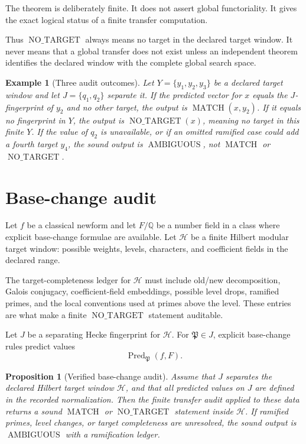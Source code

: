 \documentclass[11pt]{article}
\newtheorem{proposition}[theorem]{Proposition}
\newtheorem{example}[theorem]{Example}
\DeclareMathOperator{\MATCH}{MATCH}
\DeclareMathOperator{\NOTARGET}{NO\_TARGET}
\DeclareMathOperator{\AMBIGUOUS}{AMBIGUOUS}
\begin{document}
The theorem is deliberately finite.  It does not assert global functoriality.  It gives the exact logical status of a finite transfer computation.

Thus \(\NOTARGET\) always means no target in the declared target window.  It never means that a global transfer does not exist unless an independent theorem identifies the declared window with the complete global search space.

\begin{example}[Three audit outcomes]
Let \(Y=\{y_1,y_2,y_3\}\) be a declared target window and let \(J=\{q_1,q_2\}\) separate it.  If the predicted vector for \(x\) equals the \(J\)-fingerprint of \(y_2\) and no other target, the output is \(\MATCH(x,y_2)\).  If it equals no fingerprint in \(Y\), the output is \(\NOTARGET(x)\), meaning no target in this finite \(Y\).  If the value of \(q_2\) is unavailable, or if an omitted ramified case could add a fourth target \(y_4\), the sound output is \(\AMBIGUOUS\), not \(\MATCH\) or \(\NOTARGET\).
\end{example}

\section{Base-change audit}

Let \(f\) be a classical newform and let \(F/\mathbb Q\) be a number field in a class where explicit base-change formulae are available.  Let \(\mathcal H\) be a finite Hilbert modular target window: possible weights, levels, characters, and coefficient fields in the declared range.

The target-completeness ledger for \(\mathcal H\) must include old/new decomposition, Galois conjugacy, coefficient-field embeddings, possible level drops, ramified primes, and the local conventions used at primes above the level.  These entries are what make a finite \(\NOTARGET\) statement auditable.

Let \(J\) be a separating Hecke fingerprint for \(\mathcal H\).  For \(\mathfrak P\in J\), explicit base-change rules predict values
\[
\operatorname{Pred}_{\mathfrak P}(f,F).
\]

\begin{proposition}[Verified base-change audit]
Assume that \(J\) separates the declared Hilbert target window \(\mathcal H\), and that all predicted values on \(J\) are defined in the recorded normalization.  Then the finite transfer audit applied to these data returns a sound \(\MATCH\) or \(\NOTARGET\) statement inside \(\mathcal H\).  If ramified primes, level changes, or target completeness are unresolved, the sound output is \(\AMBIGUOUS\) with a ramification ledger.
\end{proposition}
\end{document}
